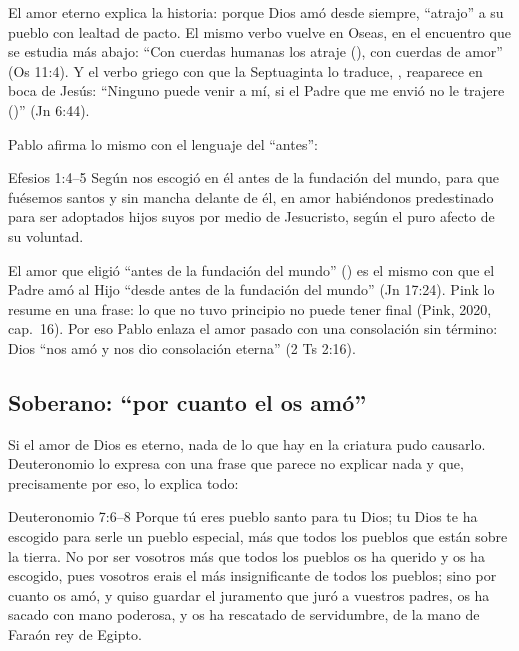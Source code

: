 El amor eterno explica la historia: porque Dios amó desde siempre, ``atrajo'' a su pueblo con lealtad de pacto. El mismo verbo vuelve en Oseas, en el encuentro que se estudia más abajo: ``Con cuerdas humanas los atraje (), con cuerdas de amor'' (Os 11:4). Y el verbo griego con que la Septuaginta lo traduce, , reaparece en boca de Jesús: ``Ninguno puede venir a mí, si el Padre que me envió no le trajere ()'' (Jn 6:44).


Pablo afirma lo mismo con el lenguaje del ``antes'':

\begin{verso}{Efesios 1:4–5}
Según nos escogió en él antes de la fundación del mundo, para que fuésemos santos y sin mancha delante de él, en amor habiéndonos predestinado para ser adoptados hijos suyos por medio de Jesucristo, según el puro afecto de su voluntad.
\end{verso}

El amor que eligió ``antes de la fundación del mundo'' () es el mismo con que el Padre amó al Hijo ``desde antes de la fundación del mundo'' (Jn 17:24). Pink lo resume en una frase: lo que no tuvo principio no puede tener final (Pink, 2020, cap.~16). Por eso Pablo enlaza el amor pasado con una consolación sin término: Dios ``nos amó y nos dio consolación eterna'' (2 Ts 2:16).

\subsection{Soberano: “por cuanto el \SENOR{} os amó”}
Si el amor de Dios es eterno, nada de lo que hay en la criatura pudo causarlo. Deuteronomio lo expresa con una frase que parece no explicar nada y que, precisamente por eso, lo explica todo:

\begin{verso}{Deuteronomio 7:6–8}
Porque tú eres pueblo santo para \SENOR{} tu Dios; \SENOR{} tu Dios te ha escogido para serle un pueblo especial, más que todos los pueblos que están sobre la tierra. No por ser vosotros más que todos los pueblos os ha querido \SENOR{} y os ha escogido, pues vosotros erais el más insignificante de todos los pueblos; sino por cuanto \SENOR{} os amó, y quiso guardar el juramento que juró a vuestros padres, os ha sacado \SENOR{} con mano poderosa, y os ha rescatado de servidumbre, de la mano de Faraón rey de Egipto.
\end{verso}

